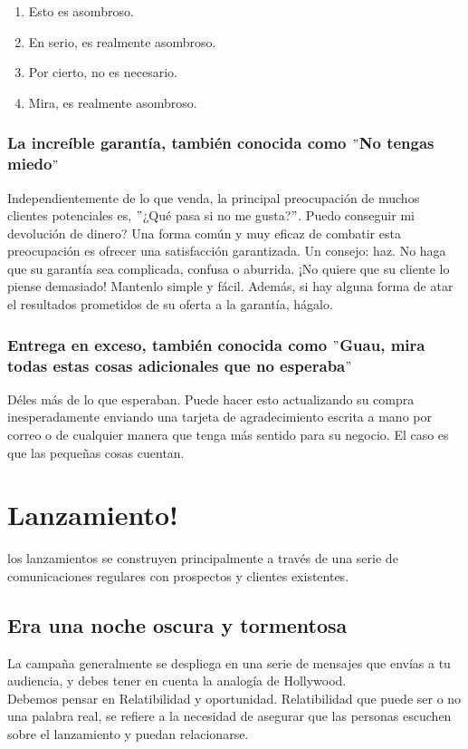 \documentclass[10pt]{book}
\begin{document}
		    \begin{enumerate}
			    \item Esto es asombroso.
			    \item En serio, es realmente asombroso.
			    \item Por cierto, no es necesario.
			    \item Mira, es realmente asombroso.
		    \end{enumerate}

		\subsection{La increíble garantía, también conocida como $"$No tengas miedo$"$}
		    Independientemente de lo que venda, la principal preocupación de muchos clientes potenciales es, $"$¿Qué pasa si no me gusta?$"$. Puedo conseguir mi devolución de dinero? Una forma común y muy eficaz de combatir esta preocupación es ofrecer una satisfacción garantizada. Un consejo: haz. No haga que su garantía sea complicada, confusa o aburrida. ¡No quiere que su cliente lo piense demasiado! Mantenlo simple y fácil. Además, si hay alguna forma de atar el resultados prometidos de su oferta a la garantía, hágalo.

		\subsection{Entrega en exceso, también conocida como $"$Guau, mira todas estas cosas adicionales que no esperaba$"$}

		Déles más de lo que esperaban. Puede hacer esto actualizando su compra inesperadamente enviando una tarjeta de agradecimiento escrita a mano por correo o de cualquier manera que tenga más sentido para su negocio. El caso es que las pequeñas cosas cuentan.

    \chapter{Lanzamiento!}
    los lanzamientos se construyen principalmente a través de una serie de comunicaciones regulares con prospectos y clientes existentes. 

	\section{Era una noche oscura y tormentosa}
	La campaña generalmente  se despliega en una serie de mensajes que envías a tu audiencia, y debes tener en cuenta la analogía de Hollywood. \\
	Debemos pensar en Relatibilidad y oportunidad. Relatibilidad que puede ser o no una palabra real, se refiere a la necesidad de asegurar que las personas escuchen sobre el lanzamiento y puedan relacionarse.
\end{document}
